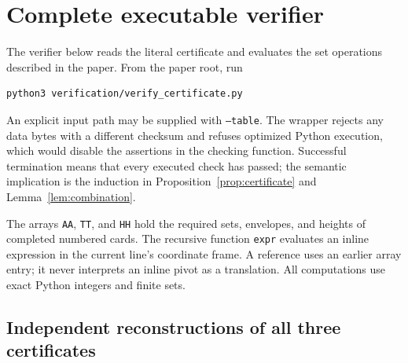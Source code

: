 

\section{Complete executable verifier}\label{app:checker}

The verifier below reads the literal certificate and evaluates the
set operations described in the paper. From the paper root,
run
\begin{lstlisting}[basicstyle=\ttfamily\small]
python3 verification/verify_certificate.py
\end{lstlisting}
An explicit input path may be supplied with \texttt{--table}.
The wrapper rejects any data bytes with a different checksum and
refuses optimized Python execution, which would disable the
assertions in the checking function. Successful termination means
that every executed check has passed; the semantic implication is
the induction in Proposition~\ref{prop:certificate} and
Lemma~\ref{lem:combination}.

The arrays \texttt{AA}, \texttt{TT}, and \texttt{HH} hold the required
sets, envelopes, and heights of completed numbered cards.
The recursive function \texttt{expr} evaluates an inline expression
in the current line's coordinate frame. A reference uses an earlier
array entry; it never interprets an inline pivot as a translation.
All computations use exact Python integers and finite sets.

\begingroup
{}\selectfont
\renewcommand{\ttdefault}{lmtt}

\endgroup

\subsection{Independent reconstructions of all three certificates}


